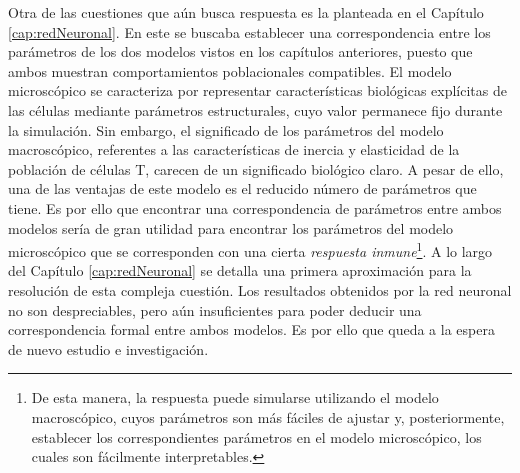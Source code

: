 Otra de las cuestiones que aún busca respuesta es la planteada en el Capítulo \ref{cap:redNeuronal}. En este se buscaba establecer una correspondencia entre los parámetros de los dos modelos vistos en los capítulos anteriores, puesto que ambos muestran comportamientos poblacionales compatibles. El modelo microscópico se caracteriza por representar características biológicas explícitas de las células mediante parámetros estructurales, cuyo valor permanece fijo durante la simulación. Sin embargo, el significado de los parámetros del modelo macroscópico, referentes a las características de inercia y elasticidad de la población de células T, carecen de un significado biológico claro. A pesar de ello, una de las ventajas de este modelo es el reducido número de parámetros que tiene. Es por ello que encontrar una correspondencia de parámetros entre ambos modelos sería de gran utilidad para encontrar los parámetros del modelo microscópico que se corresponden con una cierta \textit{respuesta inmune}\footnote{De esta manera, la respuesta puede simularse utilizando el modelo macroscópico, cuyos parámetros son más fáciles de ajustar y, posteriormente, establecer los correspondientes parámetros en el modelo microscópico, los cuales son fácilmente interpretables.}. A lo largo del Capítulo  \ref{cap:redNeuronal} se detalla una primera aproximación para la resolución de esta compleja cuestión. Los resultados obtenidos por la red neuronal no son despreciables, pero aún insuficientes para poder deducir una correspondencia formal entre ambos modelos. Es por ello que queda a la espera de nuevo estudio e investigación.


